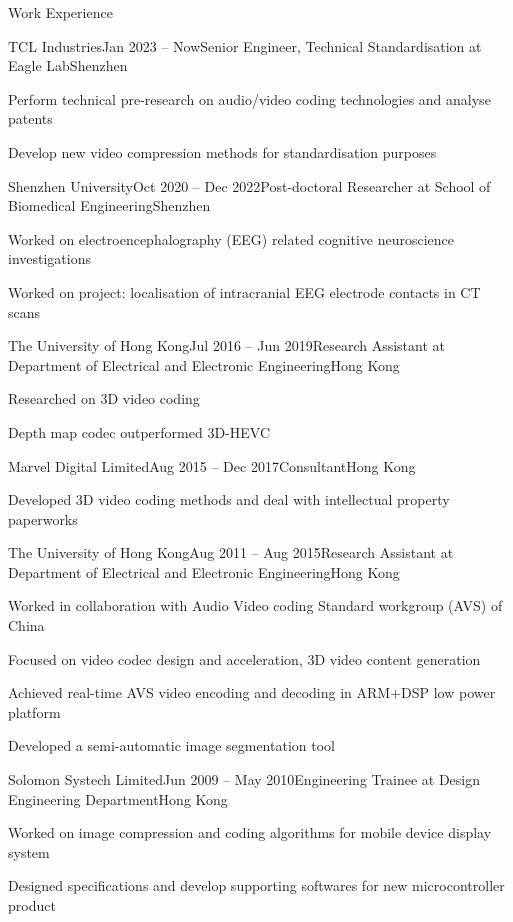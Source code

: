 \documentclass{resume} %
\begin{document}
\begin{rSection}{Work Experience}
	\begin{rSubsection}{TCL Industries}{Jan 2023 -- Now}{Senior Engineer, Technical Standardisation at Eagle Lab}{Shenzhen}
		\item Perform technical pre-research on audio/video coding technologies and analyse patents
		\item Develop new video compression methods for standardisation purposes
	\end{rSubsection}
	
	\begin{rSubsection}{Shenzhen University}{Oct 2020 -- Dec 2022}{Post-doctoral Researcher at School of Biomedical Engineering}{Shenzhen}
		\item Worked on electroencephalography (EEG) related cognitive neuroscience investigations
		\item Worked on project: localisation of intracranial EEG electrode contacts in CT scans
	\end{rSubsection}
	
	\begin{rSubsection}{The University of Hong Kong}{Jul 2016 -- Jun 2019}{Research Assistant at Department of Electrical and Electronic Engineering}{Hong Kong}
		\item Researched on 3D video coding
		\item Depth map codec outperformed 3D-HEVC
	\end{rSubsection}
	
	\begin{rSubsection}{Marvel Digital Limited}{Aug 2015 -- Dec 2017}{Consultant}{Hong Kong}
		\item Developed 3D video coding methods and deal with intellectual property paperworks 
	\end{rSubsection}
	
	\begin{rSubsection}{The University of Hong Kong}{Aug 2011 -- Aug 2015}{Research Assistant at Department of Electrical and Electronic Engineering}{Hong Kong}
		\item Worked in collaboration with Audio Video coding Standard workgroup (AVS)  of China
		\item Focused on video codec design and acceleration, 3D video content generation
		\item Achieved real-time AVS video encoding and decoding in ARM+DSP low power platform
		\item Developed a semi-automatic image segmentation tool
	\end{rSubsection}
	
	\begin{rSubsection}{Solomon Systech Limited}{Jun 2009 -- May 2010}{Engineering Trainee at Design Engineering Department}{Hong Kong}
		\item Worked on image compression and coding algorithms for mobile device display system
		\item Designed specifications and develop supporting softwares for new microcontroller product
	\end{rSubsection}
\end{rSection}
\end{document}
